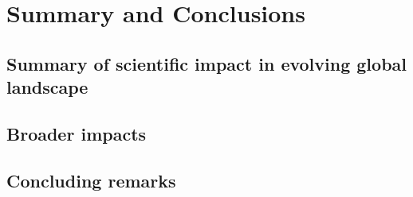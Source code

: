 \chapter{Summary and Conclusions}
\label{ch:summ-concl}


\section{Summary of scientific impact in evolving global landscape}
\label{ch:summ-concl-global}


\section{Broader impacts}
\label{ch:summ-concl-broad}


\section{Concluding remarks}
\label{ch:summ-concl-rem}